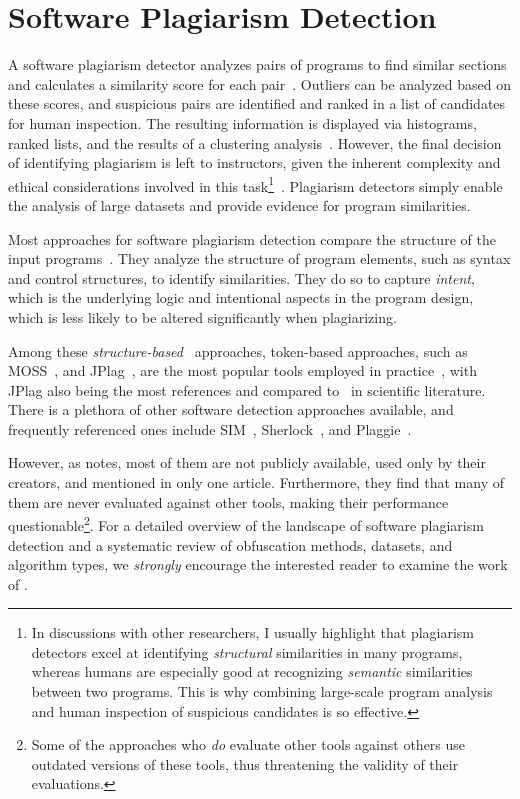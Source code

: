 \section{Software Plagiarism Detection}\label{sec:SPD}
A software plagiarism detector analyzes pairs of programs to find similar sections and calculates a similarity score for each pair~\cite{Ottenstein1976}.
Outliers can be analyzed based on these scores, and suspicious pairs are identified and ranked in a list of candidates for human inspection. The resulting information is displayed via histograms, ranked lists, and the results of a clustering analysis~\cite{Novak2021,prechelt2000}.
However, the final decision of identifying plagiarism is left to instructors, given the inherent complexity and ethical considerations involved in this task\footnote{In discussions with other researchers, I usually highlight that plagiarism detectors excel at identifying \textit{structural} similarities in many programs, whereas humans are especially good at recognizing \textit{semantic} similarities between two programs. This is why combining large-scale program analysis and human inspection of suspicious candidates is so effective.}~\cite{Culwin2001, Weber2019}. Plagiarism detectors simply enable the analysis of large datasets and provide evidence for program similarities.

Most approaches for software plagiarism detection compare the structure of the input programs~\cite{Nichols2019, Novak2019}.
They analyze the structure of program elements, such as syntax and control structures, to identify similarities. They do so to capture \textit{intent}, which is the underlying logic and intentional aspects in the program design, which is less likely to be altered significantly when plagiarizing.

Among these \textit{structure-based}~\cite{Nichols2019} approaches, token-based approaches, such as MOSS~\cite{MOSS}, and JPlag~\cite{prechelt2000}, are the most popular tools employed in practice~\cite{Aniceto2021}, with JPlag also being the most references and compared to~\cite{Novak2019} in scientific literature.
%
There is a plethora of other software detection approaches available, and frequently referenced ones include SIM~\cite{SIM}, Sherlock~\cite{Joy1999}, and Plaggie~\cite{Plaggie}.

However, as \citet{Novak2019} notes, most of them are not publicly available, used only by their creators, and mentioned in only one article. Furthermore, they find that many of them are never evaluated against other tools, making their performance questionable\footnote{Some of the approaches who \textit{do} evaluate other tools against others use outdated versions of these tools, thus threatening the validity of their evaluations.}.
%
For a detailed overview of the landscape of software plagiarism detection and a systematic review of obfuscation methods, datasets, and algorithm types, we \textit{strongly} encourage the interested reader to examine the work of \textcite{Novak2019}.

